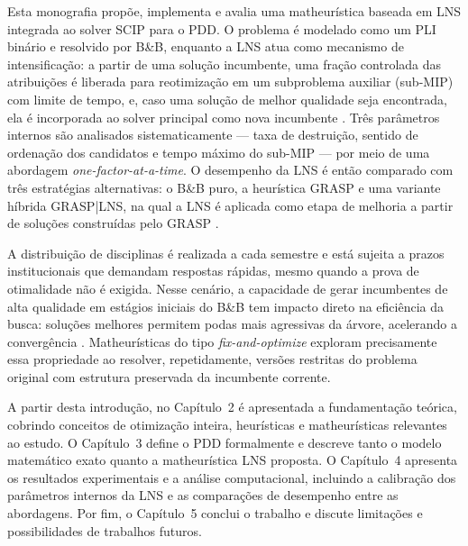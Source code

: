Esta monografia propõe, implementa e avalia uma matheurística baseada em LNS integrada ao solver SCIP para o PDD. O problema é modelado como um PLI binário e resolvido por B\&B, enquanto a LNS atua como mecanismo de intensificação: a partir de uma solução incumbente, uma fração controlada das atribuições é liberada para reotimização em um subproblema auxiliar (sub-MIP) com limite de tempo, e, caso uma solução de melhor qualidade seja encontrada, ela é incorporada ao solver principal como nova incumbente \cite{pisinger_ropke_2010}. Três parâmetros internos são analisados sistematicamente --- taxa de destruição, sentido de ordenação dos candidatos e tempo máximo do sub-MIP --- por meio de uma abordagem \textit{one-factor-at-a-time}. O desempenho da LNS é então comparado com três estratégias alternativas: o B\&B puro, a heurística GRASP \cite{jhonatan_grasp_dpd} e uma variante híbrida GRASP|LNS, na qual a LNS é aplicada como etapa de melhoria a partir de soluções construídas pelo GRASP \cite{boschetti_letchford_maniezzo_2023,maniezzo_stutzle_voss_2021}.

A distribuição de disciplinas é realizada a cada semestre e está sujeita a prazos institucionais que demandam respostas rápidas, mesmo quando a prova de otimalidade não é exigida. Nesse cenário, a capacidade de gerar incumbentes de alta qualidade em estágios iniciais do B\&B tem impacto direto na eficiência da busca: soluções melhores permitem podas mais agressivas da árvore, acelerando a convergência \cite{neto_hoshino_pedrotti_2023}. Matheurísticas do tipo \textit{fix-and-optimize} exploram precisamente essa propriedade ao resolver, repetidamente, versões restritas do problema original com estrutura preservada da incumbente corrente.

A partir desta introdução, no Capítulo~2 é apresentada a fundamentação teórica, cobrindo conceitos de otimização inteira, heurísticas e matheurísticas relevantes ao estudo. O Capítulo~3 define o PDD formalmente e descreve tanto o modelo matemático exato quanto a matheurística LNS proposta. O Capítulo~4 apresenta os resultados experimentais e a análise computacional, incluindo a calibração dos parâmetros internos da LNS e as comparações de desempenho entre as abordagens. Por fim, o Capítulo~5 conclui o trabalho e discute limitações e possibilidades de trabalhos futuros.

